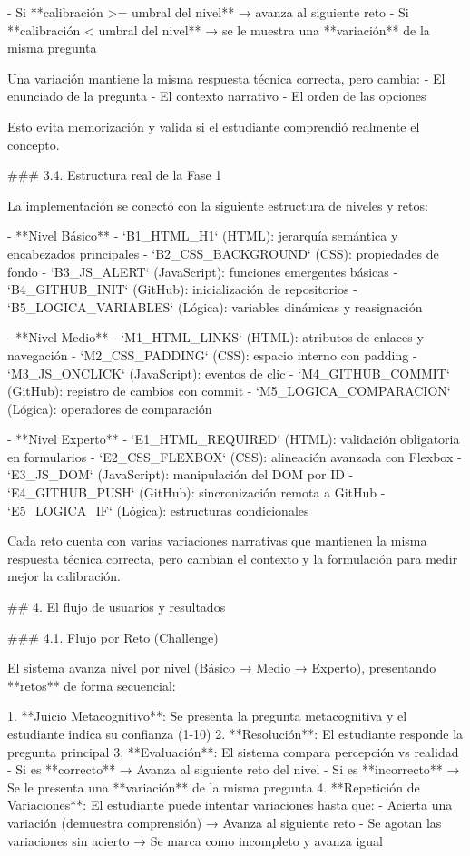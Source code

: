 - Si **calibración >= umbral del nivel** → avanza al siguiente reto
- Si **calibración < umbral del nivel** → se le muestra una **variación** de la misma pregunta

Una variación mantiene la misma respuesta técnica correcta, pero cambia:
- El enunciado de la pregunta
- El contexto narrativo
- El orden de las opciones

Esto evita memorización y valida si el estudiante comprendió realmente el concepto.

### 3.4. Estructura real de la Fase 1

La implementación se conectó con la siguiente estructura de niveles y retos:

- **Nivel Básico**
  - `B1_HTML_H1` (HTML): jerarquía semántica y encabezados principales
  - `B2_CSS_BACKGROUND` (CSS): propiedades de fondo
  - `B3_JS_ALERT` (JavaScript): funciones emergentes básicas
  - `B4_GITHUB_INIT` (GitHub): inicialización de repositorios
  - `B5_LOGICA_VARIABLES` (Lógica): variables dinámicas y reasignación

- **Nivel Medio**
  - `M1_HTML_LINKS` (HTML): atributos de enlaces y navegación
  - `M2_CSS_PADDING` (CSS): espacio interno con padding
  - `M3_JS_ONCLICK` (JavaScript): eventos de clic
  - `M4_GITHUB_COMMIT` (GitHub): registro de cambios con commit
  - `M5_LOGICA_COMPARACION` (Lógica): operadores de comparación

- **Nivel Experto**
  - `E1_HTML_REQUIRED` (HTML): validación obligatoria en formularios
  - `E2_CSS_FLEXBOX` (CSS): alineación avanzada con Flexbox
  - `E3_JS_DOM` (JavaScript): manipulación del DOM por ID
  - `E4_GITHUB_PUSH` (GitHub): sincronización remota a GitHub
  - `E5_LOGICA_IF` (Lógica): estructuras condicionales

Cada reto cuenta con varias variaciones narrativas que mantienen la misma respuesta técnica correcta, pero cambian el contexto y la formulación para medir mejor la calibración.

## 4. El flujo de usuarios y resultados

### 4.1. Flujo por Reto (Challenge)

El sistema avanza nivel por nivel (Básico → Medio → Experto), presentando **retos** de forma secuencial:

1. **Juicio Metacognitivo**: Se presenta la pregunta metacognitiva y el estudiante indica su confianza (1-10)
2. **Resolución**: El estudiante responde la pregunta principal
3. **Evaluación**: El sistema compara percepción vs realidad
   - Si es **correcto** → Avanza al siguiente reto del nivel
   - Si es **incorrecto** → Se le presenta una **variación** de la misma pregunta
4. **Repetición de Variaciones**: El estudiante puede intentar variaciones hasta que:
   - Acierta una variación (demuestra comprensión) → Avanza al siguiente reto
   - Se agotan las variaciones sin acierto → Se marca como incompleto y avanza igual

